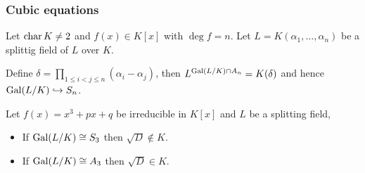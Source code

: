 \subsubsection{Cubic equations}

\begin{lemma}
  Let $\operatorname{char} K \neq 2$ and $f(x) \in K[x]$ with $\deg f = n$. Let $L = K(\alpha_1, \dots, \alpha_n)$ be
  a splittig field of $L$ over $K$.

  Define $\delta = \prod_{1 \leq i < j \leq n} (\alpha_i - \alpha_j)$, then $L^{\operatorname{Gal}(L/K) \cap A_n} = K(\delta)$
  and hence $\operatorname{Gal}(L/K) \hookrightarrow S_n$.
\end{lemma}

\begin{prop}
  Let $f(x) = x^3 + px + q$ be irreducible in $K[x]$ and $L$ be a splitting field,
  \begin{itemize}
    \item If $\operatorname{Gal}(L/K) \cong S_3$ then $\sqrt{D} \not\in K$.
    \item If $\operatorname{Gal}(L/K) \cong A_3$ then $\sqrt{D} \in K$.
  \end{itemize}
\end{prop}
